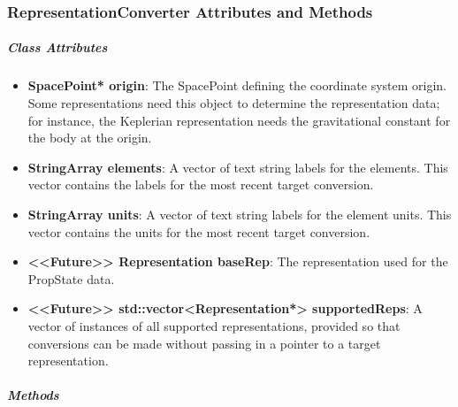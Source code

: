 \subsubsection{RepresentationConverter Attributes and Methods}

\subparagraph{\textit{Class Attributes}}

\begin{itemize}
\item \textbf{SpacePoint* origin}: The SpacePoint defining the coordinate system origin.  Some
representations need this object to determine the representation data; for instance, the Keplerian
representation needs the gravitational constant for the body at the origin.
\item \textbf{StringArray elements}: A vector of text string labels for the elements.  This
vector contains the labels for the most recent target conversion.
\item \textbf{StringArray units}: A vector of text string labels for the element units.  This
vector contains the units for the most recent target conversion.
\item \textbf{<<Future>> Representation baseRep}: The representation used for the PropState data.
\item \textbf{<<Future>> std::vector<Representation*> supportedReps}: A vector of instances of all
supported representations, provided so that conversions can be made without passing in a pointer to
a target representation.
\end{itemize}

\subparagraph{\textit{Methods}}

